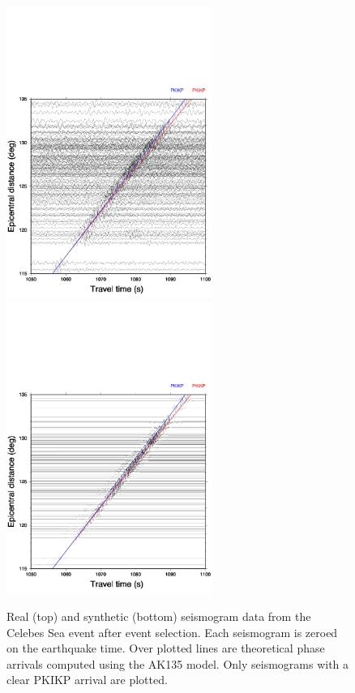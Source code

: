 \documentclass[11pt,a4paper]{article}
\begin{document}
\begin{figure}
	\centering
	\includegraphics[width=0.6\textwidth]{figures/celebessea/celebessea_real.pdf}
	\includegraphics[width=0.6\textwidth]{figures/celebessea/celebessea_synthetic_both.pdf}
	\caption{Real (top) and synthetic (bottom) seismogram data from the Celebes Sea event after event selection. Each seismogram is zeroed on the earthquake time. Over plotted lines are theoretical phase arrivals computed using the AK135 model. Only seismograms with a clear PKIKP arrival are plotted.}
	\label{fig:Real nonaligned}
\end{figure}
\end{document}
